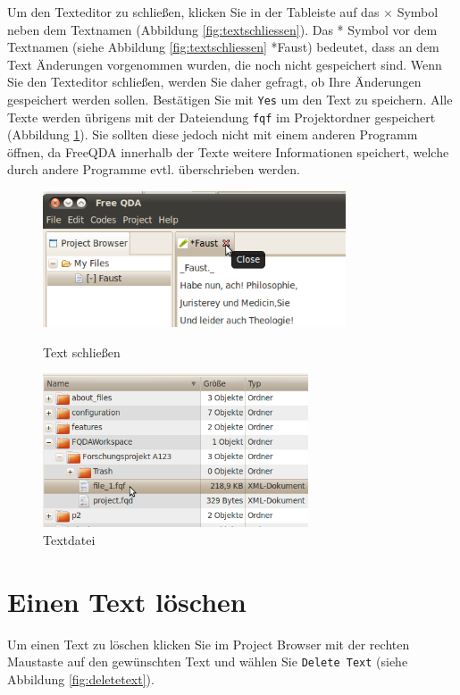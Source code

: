 Um den Texteditor zu schließen, klicken Sie in der Tableiste auf das $\times$ Symbol neben dem Textnamen (Abbildung \ref{fig:textschliessen}). %
Das * Symbol vor dem Textnamen (siehe Abbildung \ref{fig:textschliessen} *Faust) bedeutet, dass an dem Text Änderungen vorgenommen wurden, %
die noch nicht gespeichert sind. Wenn Sie den Texteditor schließen, werden Sie daher gefragt, ob Ihre Änderungen gespeichert werden sollen. %
Bestätigen Sie mit \texttt{Yes} um den Text zu speichern. Alle Texte werden übrigens mit der Dateiendung \texttt{fqf} im Projektordner gespeichert (Abbildung \ref{fig:textdatei}). %
Sie sollten diese jedoch nicht mit einem anderen Programm öffnen, da FreeQDA innerhalb der Texte weitere Informationen speichert, welche %
durch andere Programme evtl. überschrieben werden. 
\vfill
\begin{figure}[!hbt]
\begin{minipage}[!hb!]{0.5\textwidth}
	\centering
	 \includegraphics[width=0.8\textwidth]{img/TextSchliessen}
	\caption{Text schließen}
	\label{fig:textschliessen}
\end{minipage}
\hfill
\begin{minipage}[!hb!]{0.5\textwidth}
	\centering
	 \includegraphics[width=0.7\textwidth]{img/textdatei}
	\caption{Textdatei}
	\label{fig:textdatei}
\end{minipage}
\end{figure}
\newpage
\section{Einen Text löschen}
Um einen Text zu löschen klicken Sie im Project Browser mit der rechten Maustaste auf den gewünschten Text und wählen Sie %
\texttt{Delete Text} (siehe Abbildung \ref{fig:deletetext}).


